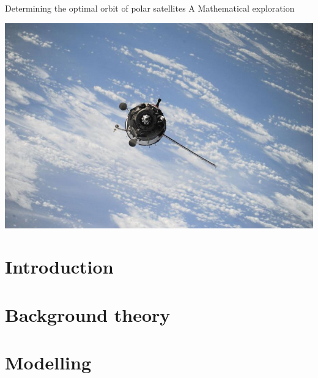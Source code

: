 \documentclass[12pt]{article}
\begin{document}
    \begin{titlepage}
        \begin{center}
            {\LARGE Determining the optimal orbit of polar satellites}
            \break
            {\large A Mathematical exploration}
            \break
            {\date{06.11.2018}}
            


            \includegraphics[scale=0.32]{pic1.jpg}
            \vspace{10pt}
            \vfill
        \end{center}
    \end{titlepage}

    \section{Introduction} %
    \section{Background theory}
    \section{Modelling}

    
\end{document}
